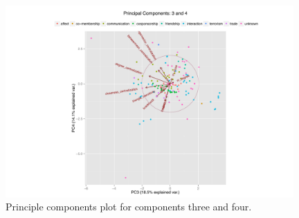 \documentclass[3p,times]{elsarticle}
\begin{document}
\begin{figure}
\begin{center}
	\caption{\label{fig:3 and 4} Principle components plot for components three and four.}
		\includegraphics[width = 0.98\textwidth]{./images/Observed_PCA_Components3_4.pdf}
\end{center}
\end{figure}


%
\end{document}
